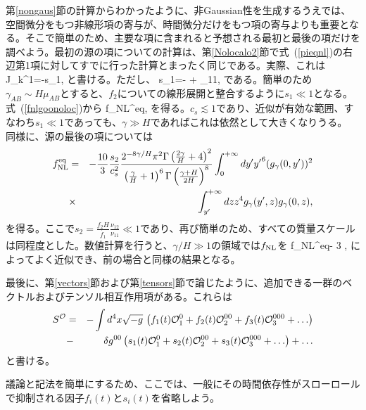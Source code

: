 第\ref{nongaus}節の計算からわかったように、非Gaussian性を生成するうえでは、空間微分をもつ非線形項の寄与が、時間微分だけをもつ項の寄与よりも重要となる。そこで簡単のため、主要な項に含まれると予想される最初と最後の項だけを調べよう。最初の源の項についての計算は、第\ref{Nolocalo2}節で式~(\ref{pieqnl})の右辺第1項に対してすでに行った計算とまったく同じである。実際、これは
\be J_k^1=-s_1\gamma{},\ee
と書ける。ただし、
\be
s_1=- + {\Gamma_{11}}, \ee
である。簡単のため$\gamma_{AB}\sim H \mu_{AB}$とすると、$f_2$についての線形展開と整合するように$s_1\ll 1$となる。式~(\ref{fnlgoonoloc})から
\beq f_{\rm NL}^{\rm eq}\simeq{},\eeq
を得る。$c_s\lesssim 1$であり、近似が有効な範囲、すなわち$s_1 \ll 1$であっても、$\gamma\gg H$であればこれは依然として大きくなりうる。\\

同様に、源の最後の項については
\begin{eqnarray}
f_{\rm NL}^{\rm eq}&=&-\frac{10}{3}\frac{s_2}{c_s^2}\frac{2^{-8\gamma/H}\pi^2 {\Gamma\left(\frac{2\gamma}{H}+4\right)}^2}{\left(\frac{\gamma}{H}+1\right)^6{\Gamma\left(\frac{\gamma+H}{2 H}\right)}^8}
 \int_{0}^{+\infty} dy' {y'}^6 (g_{\gamma}(0, y'))^2\nonumber\\&\times&\int_{y'}^{+\infty} dz z^4  g_{\gamma}( y',z)g_{\gamma}(0, z),\label{fnlmix2n}
\end{eqnarray}
を得る。ここで$s_2=\frac{f_2H}{\dot{f_1}}\frac{\nu_{12}}{\nu_{11}}\ll 1$であり、再び簡単のため、すべての質量スケールは同程度とした。数値計算を行うと、$\gamma/H\gg 1$の領域では$f_{\rm NL}$を
\beq
f_{\rm NL}^{\rm eq}\simeq- 3 ,
\eeq
によってよく近似でき、前の場合と同様の結果となる。

\label{vectens}

最後に、第\ref{vectors}節および第\ref{tensors}節で論じたように、追加できる一群のベクトルおよびテンソル相互作用項がある。これらは
\begin{eqnarray}\label{family}
S^{{\cal O}}&=&-\int d^4 x \sqrt{-g}\,\left(f_1(t){\cal O}^{0}_1+f_2(t){\cal O}^{00}_2+f_3(t){\cal O}^{000}_3+\ldots\right) \\
&-&\delta g^{00}\left(s_1(t){\cal O}^{0}_1+s_2(t){\cal O}^{00}_2+s_3(t){\cal O}^{000}_3+\ldots\right)+\ldots\nonumber
\end{eqnarray}
と書ける。

議論と記法を簡単にするため、ここでは、一般にその時間依存性がスローロールで抑制される因子$f_i(t)$と$s_i(t)$を省略しよう。\\

